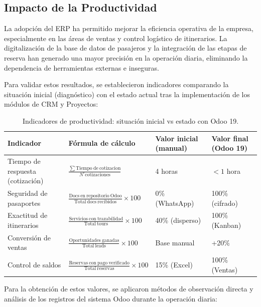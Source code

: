\subsection{Impacto de la Productividad}

La adopción del ERP ha permitido mejorar la eficiencia operativa de la empresa, especialmente
en las áreas de ventas y control logístico de itinerarios. La digitalización de la base de
datos de pasajeros y la integración de las etapas de reserva han generado una mayor precisión
en la operación diaria, eliminando la dependencia de herramientas externas e inseguras.

Para validar estos resultados, se establecieron indicadores comparando la situación inicial
(diagnóstico) con el estado actual tras la implementación de los módulos de CRM y Proyectos:

\begin{table}[htbp]
\centering
\renewcommand{\arraystretch}{1.25}
\begin{tabular}{|p{2.8cm}|p{3.8cm}|p{2.8cm}|p{3.3cm}|}
\hline
\textbf{Indicador} & \textbf{Fórmula de cálculo} & \textbf{Valor inicial (manual)} & \textbf{Valor final (Odoo 19)} \\ \hline
Tiempo de respuesta (cotización) & $\frac{\sum \mathrm{Tiempo\ de\ cotizacion}}{N^\circ \mathrm{cotizaciones}}$ & 4 horas & $< 1$ hora \\ \hline
Seguridad de pasaportes & $\frac{\mathrm{Docs\ en\ repositorio\ Odoo}}{\mathrm{Total\ docs\ recibidos}} \times 100$ & 0\% (WhatsApp) & 100\% (cifrado) \\ \hline
Exactitud de itinerarios & $\frac{\mathrm{Servicios\ con\ trazabilidad}}{\mathrm{Total\ tours}} \times 100$ & 40\% (disperso) & 100\% (Kanban) \\ \hline
Conversión de ventas & $\frac{\mathrm{Oportunidades\ ganadas}}{\mathrm{Total\ leads}} \times 100$ & Base manual & +20\% \\ \hline
Control de saldos & $\frac{\mathrm{Reservas\ con\ pago\ verificado}}{\mathrm{Total\ reservas}} \times 100$ & 15\% (Excel) & 100\% (Ventas) \\ \hline
\end{tabular}
\caption{Indicadores de productividad: situación inicial vs estado con Odoo 19.}
\end{table}

Para la obtención de estos valores, se aplicaron métodos de observación directa y análisis
de los registros del sistema Odoo durante la operación diaria:

